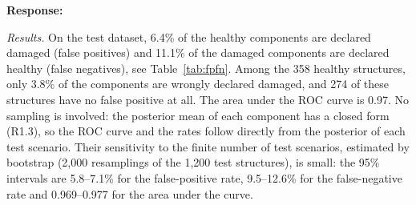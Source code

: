 \documentclass[11pt]{article}
\newenvironment{response}{\par\smallskip\noindent\color{resp}\textbf{Response:}\ }{\par}
\begin{document}
\begin{response}


\textit{Results.} On the test dataset, 6.4\% of the healthy components are declared damaged (false positives) and 11.1\%
of the damaged components are declared healthy (false negatives), see Table~\ref{tab:fpfn}. Among the 358 healthy
structures, only 3.8\% of the components are wrongly declared damaged, and 274 of these structures have no false positive
at all. The area under the ROC curve is 0.97. No sampling is involved: the posterior mean of each component has a closed
form (R1.3), so the ROC curve and the rates follow directly from the posterior of each test scenario. Their sensitivity
to the finite number of test scenarios, estimated by bootstrap (2,000 resamplings of the 1,200 test structures), is
small: the 95\% intervals are 5.8--7.1\% for the false-positive rate, 9.5--12.6\% for the false-negative rate and
0.969--0.977 for the area under the curve.


\end{response}
\end{document}
